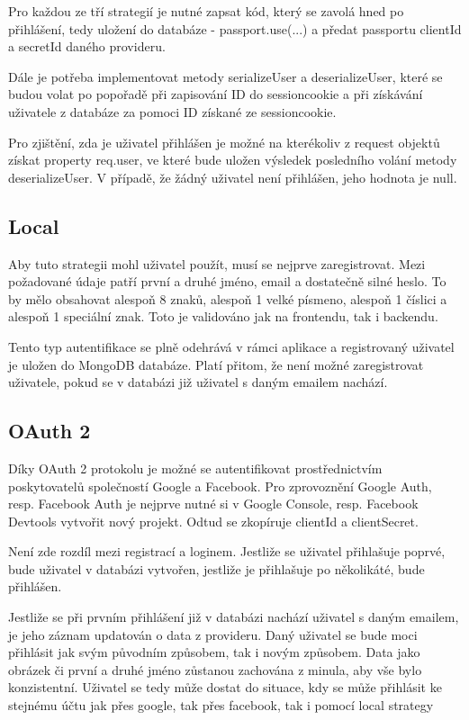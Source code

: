 \documentclass[a4paper,oneside,12pt]{report}
\begin{document}
Pro každou ze tří strategií je nutné zapsat kód, který se zavolá hned po přihlášení, tedy uložení do databáze - passport.use(...) a předat passportu clientId a secretId daného provideru.

Dále je potřeba implementovat metody serializeUser a deserializeUser, které se budou volat po popořadě při zapisování ID do sessioncookie a při získávání uživatele z databáze za pomoci ID získané ze sessioncookie.

Pro zjištění, zda je uživatel přihlášen je možné na kterékoliv z request objektů získat property req.user, ve které bude uložen výsledek posledního volání metody deserializeUser. V případě, že žádný uživatel není přihlášen, jeho hodnota je null.

\subsection{Local}
Aby tuto strategii mohl uživatel použít, musí se nejprve zaregistrovat. Mezi požadované údaje patří první a druhé jméno, email a dostatečně silné heslo. To by mělo obsahovat alespoň 8 znaků, alespoň 1 velké písmeno, alespoň 1 číslici a alespoň 1 speciální znak. Toto je validováno jak na frontendu, tak i backendu. 

Tento typ autentifikace se plně odehrává v rámci aplikace a registrovaný uživatel je uložen do MongoDB databáze. Platí přitom, že není možné zaregistrovat uživatele, pokud se v databázi již uživatel s daným emailem nachází. 

\subsection{OAuth 2}

Díky OAuth 2 protokolu je možné se autentifikovat prostřednictvím poskytovatelů společností Google a Facebook. Pro zprovoznění Google Auth, resp. Facebook Auth je nejprve nutné si v Google Console, resp. Facebook Devtools vytvořit nový projekt. Odtud se zkopíruje clientId a clientSecret.

Není zde rozdíl mezi registrací a loginem. Jestliže se uživatel přihlašuje poprvé, bude uživatel v databázi vytvořen, jestliže je přihlašuje po několikáté, bude přihlášen. 

Jestliže se při prvním přihlášení již v databázi nachází uživatel s daným emailem, je jeho záznam updatován o data z provideru. Daný uživatel se bude moci přihlásit jak svým původním způsobem, tak i novým způsobem. Data jako obrázek či první a druhé jméno zůstanou zachována z minula, aby vše bylo konzistentní. Uživatel se tedy může dostat do situace, kdy se může přihlásit ke stejnému účtu jak přes google, tak přes facebook, tak i pomocí local strategy
\end{document}
